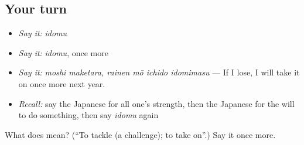 \subsection*{Your turn}
\begin{itemize}
\raggedright
  \item \emph{Say it:} \emph{idomu}
  \item \emph{Say it:} \emph{idomu}, once more
  \item \emph{Say it:} \emph{moshi maketara, rainen mō ichido idomimasu} — If I lose, I will take it on once more next year.
  \item \emph{Recall:} say the Japanese for all one's strength, then the Japanese for the will to do something, then say \emph{idomu} again
\end{itemize}

\begin{tcolorbox}[breakable,colback=teal!4,colframe=teal!35!black,title={Before you move on}]
What does  mean? (\textquotedblleft{}To tackle (a challenge); to take on\textquotedblright{}.) Say it once more.
\end{tcolorbox}
